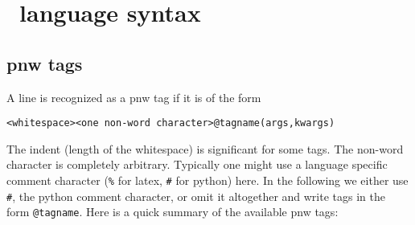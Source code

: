 \documentclass[neutral,proc,reqno]{ml-gen}
\begin{document}
\newpage

\section{\pnw\ language syntax}
\subsection{pnw tags}

A line is recognized as a pnw tag if it is of the form

\begin{lstlisting}
<whitespace><one non-word character>@tagname(args,kwargs)
\end{lstlisting}
The indent (length of the whitespace) is significant for some tags. The
non-word character is completely arbitrary. Typically one might use a
language specific comment character (\lstinline!%! for latex,
\lstinline!#! for python) here. In the following we either use
\lstinline!#!, the python comment character, or omit it altogether and
write tags in the form \lstinline!@tagname!. Here is a quick summary of
the available pnw tags:
\end{document}
